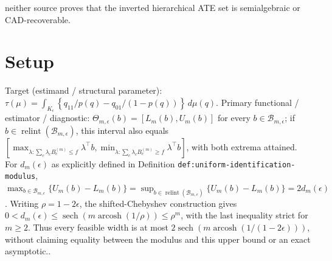 \documentclass{article}
\begin{document}
neither source proves that the inverted hierarchical ATE set is semialgebraic or CAD-recoverable.

\section{Setup}

Target (estimand / structural parameter): \(\tau(\mu)=\int_{K_{\epsilon}}\left\{q_{11}/p(q)-q_{01}/(1-p(q))\right\}\,d\mu(q)\).
Primary functional / estimator / diagnostic: \(\Theta_{m,\epsilon}(b)=[L_m(b),U_m(b)]\) for every \(b\in\mathcal B_{m,\epsilon}\); if \(b\in\operatorname{relint}(\mathcal B_{m,\epsilon})\), this interval also equals \(\left[\max_{\lambda:\sum_c\lambda_cB_c^{(m)}\leq f}\lambda^\top b,\min_{\lambda:\sum_c\lambda_cB_c^{(m)}\geq f}\lambda^\top b\right]\), with both extrema attained. For \(d_m(\epsilon)\) as explicitly defined in Definition \texttt{def:uniform-identification-modulus}, \(\max_{b\in\mathcal B_{m,\epsilon}}\{U_m(b)-L_m(b)\}=\sup_{b\in\operatorname{relint}(\mathcal B_{m,\epsilon})}\{U_m(b)-L_m(b)\}=2d_m(\epsilon)\). Writing \(\rho=1-2\epsilon\), the shifted-Chebyshev construction gives \(0<d_m(\epsilon)\leq\operatorname{sech}(m\operatorname{arcosh}(1/\rho))\leq\rho^m\), with the last inequality strict for \(m\geq2\). Thus every feasible width is at most \(2\operatorname{sech}(m\operatorname{arcosh}(1/(1-2\epsilon)))\), without claiming equality between the modulus and this upper bound or an exact asymptotic..
\end{document}
